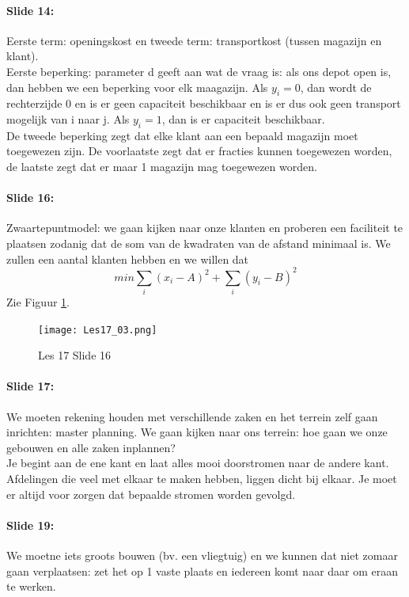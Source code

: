 \documentclass[10pt,a4paper]{report}
\begin{document}
\paragraph{Slide 14:} Eerste term: openingskost en tweede term: transportkost (tussen magazijn en klant).\\
Eerste beperking: parameter d geeft aan wat de vraag is: als ons depot open is, dan hebben we een beperking voor elk maagazijn. Als $y_{i} = 0$, dan wordt de rechterzijde 0 en is er geen capaciteit beschikbaar en is er dus ook geen transport mogelijk van i naar j. Als $y_{i} = 1$, dan is er capaciteit beschikbaar.\\ 
De tweede beperking zegt dat elke klant aan een bepaald magazijn moet toegewezen zijn.
De voorlaatste zegt dat er fracties kunnen toegewezen worden, de laatste zegt dat er maar 1 magazijn mag toegewezen worden.

\paragraph{Slide 16:} Zwaartepuntmodel: we gaan kijken naar onze klanten en proberen een faciliteit te plaatsen zodanig dat de som van de kwadraten van de afstand minimaal is.
We zullen een aantal klanten hebben en we willen dat
 $$min \sum_{i} (x_{i}-A)^2 + \sum_{i} (y_{i}-B)^2$$
Zie Figuur \ref{les17_03}.

\begin{figure}[h!]
\centering
\texttt{[image: Les17\_03.png]}
\caption{Les 17 Slide 16} 
\label{les17_03}
\end{figure}

\paragraph{Slide 17:} We moeten rekening houden met verschillende zaken en het terrein zelf gaan inrichten: master planning. We gaan kijken naar ons terrein: hoe gaan we onze gebouwen en alle zaken inplannen?\\
Je begint aan de ene kant en laat alles mooi doorstromen naar de andere kant.
Afdelingen die veel met elkaar te maken hebben, liggen dicht bij elkaar. 
Je moet er altijd voor zorgen dat bepaalde stromen worden gevolgd.

\paragraph{Slide 19:} We moetne iets groots bouwen (bv. een vliegtuig) en we kunnen dat niet zomaar gaan verplaatsen: zet het op 1 vaste plaats en iedereen komt naar daar om eraan te werken. 
\end{document}
